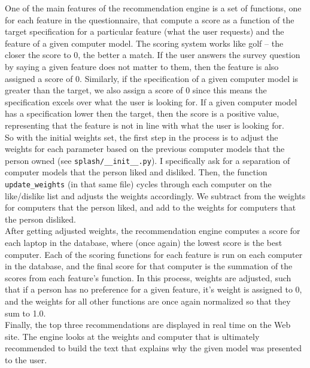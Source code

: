 \documentclass[10pt,letter]{article}
\begin{document}
One of the main features of the recommendation engine is a set of functions, one for each feature in the questionnaire, that compute a score as a function of the target specification for a particular feature (what the user requests) and the feature of a given computer model. The scoring system works like golf -- the closer the score to 0, the better a match. If the user answers the survey question by saying a given feature does not matter to them, then the feature is also assigned a score of 0. Similarly, if the specification of a given computer model is greater than the target, we also assign a score of 0 since this means the specification excels over what the user is looking for. If a given computer model has a specification lower then the target, then the score is a positive value, representing that the feature is not in line with what the user is looking for.\\

So with the initial weights set, the first step in the process is to adjust the weights for each parameter based on the previous computer models that the person owned (see \texttt{splash/\_\_init\_\_.py}). I specifically ask for a separation of computer models that the person liked and disliked. Then, the function \texttt{update\_weights} (in that same file) cycles through each computer on the like/dislike list and adjusts the weights accordingly. We subtract from the weights for computers that the person liked, and add to the weights for computers that the person disliked.\\

After getting adjusted weights, the recommendation engine computes a score for each laptop in the database, where (once again) the lowest score is the best computer. Each of the scoring functions for each feature is run on each computer in the database, and the final score for that computer is the summation of the scores from each feature's function. In this process, weights are adjusted, such that if a person has no preference for a given feature, it's weight is assigned to 0, and the weights for all other functions are once again normalized so that they sum to 1.0.\\

Finally, the top three recommendations are displayed in real time on the Web site. The engine looks at the weights and computer that is ultimately recommended to build the text that explains why the given model was presented to the user.
\end{document}
